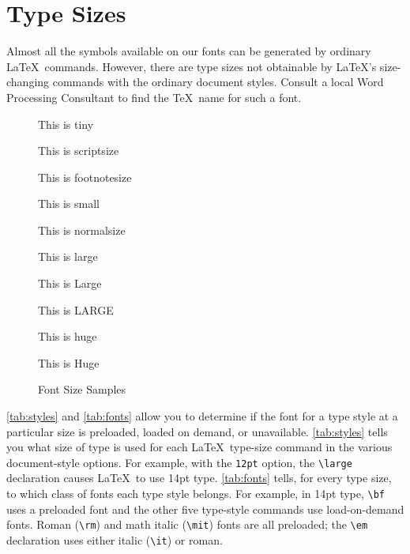 \chapter{Type Sizes}
 
Almost all the symbols available on our fonts can be generated by
ordinary \LaTeX\ commands.  However, there are type sizes not
obtainable by \LaTeX's size-changing commands with the ordinary
document styles.  Consult a local Word Processing Consultant
to find the
\TeX\ name for such a font.
 
\begin{figure}
\centering
{\tiny This is tiny}\par
{\scriptsize This is scriptsize}\par
{\footnotesize This is footnotesize}\par
{\small This is small}\par
{\normalsize This is normalsize}\par
{\large This is large}\par
{\Large This is Large}\par
{\LARGE This is LARGE}\par
{\huge This is huge}\par
{\Huge This is Huge}\par
\vspace{1em}
\caption{Font Size Samples}
\end{figure}
 
\ref{tab:styles} and \ref{tab:fonts} allow you
to determine if the font for a type style at a particular
size is preloaded, loaded on demand, or unavailable.
\ref{tab:styles} tells you what size of type is used for each
\LaTeX\ type-size command in the various document-style options.  For
example, with the {\tt 12pt} option, the \hbox{\verb|\large|}
declaration causes \LaTeX\ to use 14pt type.  \ref{tab:fonts}
tells, for every type size, to which class of fonts each type style
belongs.  For example, in 14pt type, \verb|\bf| uses a preloaded
font and the other five type-style commands use load-on-demand fonts.
Roman (\verb|\rm|) and math italic (\verb|\mit|) fonts are all
preloaded; the \hbox{\verb|\em|} declaration uses either italic
(\verb|\it|) or roman.
 
